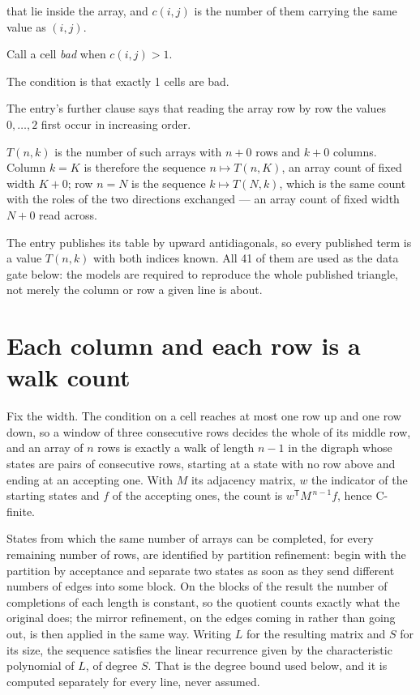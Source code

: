 \documentclass[11pt]{article}
\theoremstyle{definition}
\begin{document}
that lie inside the array, and $c(i,j)$ is the number of them carrying the same value as $(i,j)$.

Call a cell {\itshape bad} when $c(i,j) > 1$.

The condition is that exactly 1 cells are bad.

The entry's further clause says that reading the array row by row the values $0,\dots,2$ first occur in increasing order.

$T(n,k)$ is the number of such arrays with $n + 0$ rows and $k + 0$ columns. Column $k = K$ is therefore the sequence $n \mapsto T(n,K)$, an array count of fixed width $K + 0$; row $n = N$ is the sequence $k \mapsto T(N,k)$, which is the same count with the roles of the two directions exchanged --- an array count of fixed width $N + 0$ read across.

The entry publishes its table by upward antidiagonals, so every published term is a value $T(n,k)$ with both indices known. All 41 of them are used as the data gate below: the models are required to reproduce the whole published triangle, not merely the column or row a given line is about.

\section{Each column and each row is a walk count}

Fix the width. The condition on a cell reaches at most one row up and one row down, so a window of three consecutive rows decides the whole of its middle row, and an array of $n$ rows is exactly a walk of length $n-1$ in the digraph whose states are pairs of consecutive rows, starting at a state with no row above and ending at an accepting one. With $M$ its adjacency matrix, $w$ the indicator of the starting states and $f$ of the accepting ones, the count is $w^{\mathsf T}M^{\,n-1}f$, hence C-finite.

States from which the same number of arrays can be completed, for every remaining number of rows, are identified by partition refinement: begin with the partition by acceptance and separate two states as soon as they send different numbers of edges into some block. On the blocks of the result the number of completions of each length is constant, so the quotient counts exactly what the original does; the mirror refinement, on the edges coming in rather than going out, is then applied in the same way. Writing $L$ for the resulting matrix and $S$ for its size, the sequence satisfies the linear recurrence given by the characteristic polynomial of $L$, of degree $S$. That is the degree bound used below, and it is computed separately for every line, never assumed.
\end{document}
